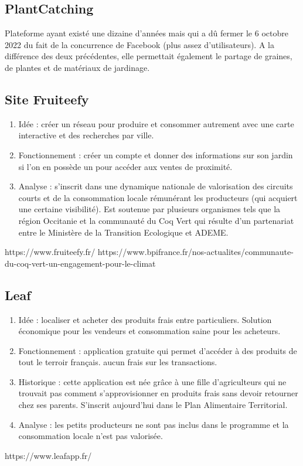 \documentclass{article}
\begin{document}
\subsection{PlantCatching} Plateforme ayant existé une dizaine d'années mais
qui a dû fermer le 6 octobre 2022 du fait de la concurrence de Facebook
(plus assez d'utilisateurs). A la différence des deux précédentes, elle
permettait également le partage de graines, de plantes et de matériaux de
jardinage.

\subsection{Site Fruiteefy}
\begin{enumerate}
    \item Idée : créer un réseau pour produire et consommer autrement
    avec une carte interactive et des recherches par ville.
    \item Fonctionnement : créer un compte et donner des informations sur
    son jardin si l'on en possède un pour accéder aux ventes de proximité. 
    \item Analyse : s'inscrit dans une dynamique nationale de valorisation
    des circuits courts et de la consommation locale rémunérant les
    producteurs (qui acquiert une certaine visibilité). Est soutenue par
    plusieurs organismes tels que la région Occitanie et la communauté du 
    Coq Vert qui résulte d'un partenariat entre le Ministère de la 
    Transition Ecologique et ADEME.
\end{enumerate}
https://www.fruiteefy.fr/
https://www.bpifrance.fr/nos-actualites/communaute-du-coq-vert-un-engagement-pour-le-climat

\subsection{Leaf}
\begin{enumerate}
    \item Idée : localiser et acheter des produits frais entre particuliers.
    Solution économique pour les vendeurs et consommation saine pour les
    acheteurs.
    \item Fonctionnement : application gratuite qui permet d'accéder à
    des produits de tout le terroir français. aucun frais sur les
    transactions.
    \item Historique : cette application est née grâce à une fille 
    d'agriculteurs qui ne trouvait pas comment s'approvisionner en 
    produits frais sans devoir retourner chez ses parents.
    S'inscrit aujourd'hui dans le Plan Alimentaire Territorial.
    \item Analyse : les petits producteurs ne sont pas inclus dans le 
    programme et la consommation locale n'est pas valorisée.
\end{enumerate}
https://www.leafapp.fr/
\end{document}
